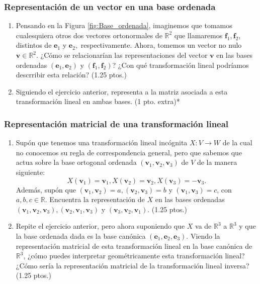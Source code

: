 \documentclass[12pt]{article}
\begin{document}
\subsubsection{Representación de un vector en una base ordenada}
\begin{enumerate}
    \item Pensando en la Figura \ref{fig:Base_ordenada}, imaginemos que tomamos cualesquiera otros dos vectores ortonormales de $\mathbb{R}^2$ que llamaremos $\mathbf{f}_1, \mathbf{f}_2$, distintos de $\mathbf{e}_1$ y $\mathbf{e}_2,$ respectivamente. Ahora, tomemos un vector no nulo $\mathbf{v}\in\mathbb{R}^2$. ¿Cómo se relacionarían las representaciones del vector $\mathbf{v}$ en las bases ordenadas $(\mathbf{e}_1,\mathbf{e}_2)$ y $(\mathbf{f}_1,\mathbf{f}_2)$? ¿Con qué transformación lineal podríamos descrribir esta relación? (1.25 ptos.)
    \item Siguiendo el ejercicio anterior, representa a la matriz asociada a esta transformación lineal en ambas bases. (1 pto. extra)*
\end{enumerate}

\subsubsection{Representación matricial de una transformación lineal}
\begin{enumerate}
    \item Supón que tenemos una transformación lineal incógnita $X:V\to W$ de la cual no conocemos su regla de correspondencia general, pero que sabemos que actua sobre la base ortogonal ordenada $(\mathbf{v}_1,\mathbf{v}_2,\mathbf{v}_3)$ de $V$ de la manera siguiente:
        \[ X(\mathbf{v}_1) = \mathbf{v}_1, X(\mathbf{v}_2)=\mathbf{v}_2, X(\mathbf{v}_3)=-\mathbf{v}_3
        .\] Además, supón que $(\mathbf{v}_1,\mathbf{v}_2)=a, (\mathbf{v}_2,\mathbf{v}_3)=b$ y $(\mathbf{v}_1,\mathbf{v}_3)=c$, con $a,b,c\in\mathbb{R}$. Encuentra la representación de $X$ en las bases ordenadas $(\mathbf{v}_1,\mathbf{v}_2,\mathbf{v}_3), (\mathbf{v}_2,\mathbf{v}_1,\mathbf{v}_3)$ y $(\mathbf{v}_3,\mathbf{v}_2,\mathbf{v}_1)$. (1.25 ptos.)

    \item Repite el ejercicio anterior, pero ahora suponiendo que $X$ va de $\mathbb{R}^3$ a $\mathbb{R}^3$ y que la base ordenada dada es la base canónica $(\mathbf{e}_1,\mathbf{e}_2,\mathbf{e}_3)$. Viendo la representación matricial de esta transformación lineal en la base canónica de $\mathbb{R}^3$, ¿cómo puedes interpretar geométricamente esta transformación lineal? ¿Cómo sería la representación matricial de la transformación lineal inversa? (1.25 ptos.)
\end{enumerate}
\end{document}
